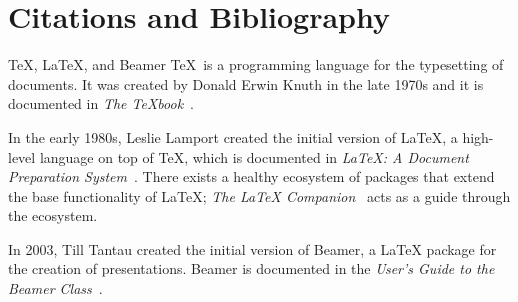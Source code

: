\documentclass{ELSAbeamer}
\begin{document}
\section{Citations and Bibliography}

\begin{frame}{\TeX, \LaTeX, and Beamer} \justifying
\TeX\ is a programming language for the typesetting of documents. It was created by Donald Erwin Knuth in the late 1970s and it is documented in \emph{The \TeX book}~\cite{knuth1984texbook}.

\bigskip

In the early 1980s, Leslie Lamport created the initial version of \LaTeX, a high-level language on top of \TeX, which is documented in \emph{\LaTeX{}: A Document Preparation System}~\cite{lamport1994latex}. There exists a healthy ecosystem of packages that extend the base functionality of \LaTeX; \emph{The \LaTeX{} Companion}~\cite{mittelbach2004latex} acts as a guide through the ecosystem.

\bigskip

In 2003, Till Tantau created the initial version of Beamer, a \LaTeX{} package for the creation of presentations. Beamer is documented in the \emph{User's Guide to the Beamer Class}~\cite{tantau2004user}.
\end{frame}

\end{document}
